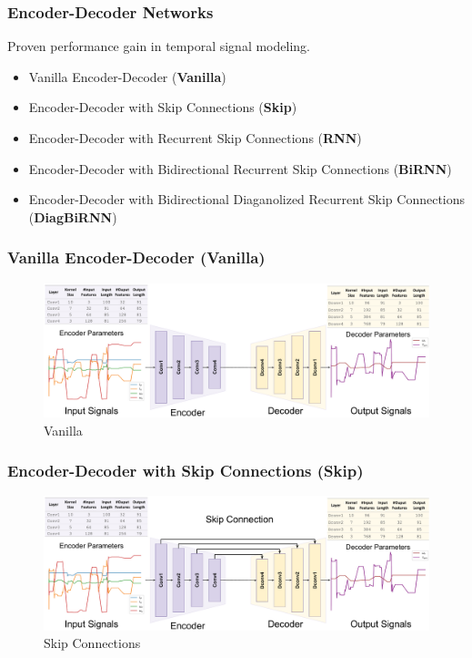 \documentclass{beamer}
\begin{document}
\begin{frame}
\frametitle{Encoder-Decoder Networks}

Proven performance gain in temporal signal modeling.
\begin{itemize}
    \item Vanilla Encoder-Decoder (\textbf{Vanilla})
    \item Encoder-Decoder with Skip Connections (\textbf{Skip})
    \item Encoder-Decoder with Recurrent Skip Connections (\textbf{RNN})
    \item Encoder-Decoder with Bidirectional Recurrent Skip Connections (\textbf{BiRNN})
    \item Encoder-Decoder with Bidirectional Diaganolized Recurrent Skip Connections (\textbf{DiagBiRNN})
\end{itemize}
\end{frame}
\begin{frame}
\frametitle{Vanilla Encoder-Decoder (Vanilla)}

\begin{figure}[ht!]
    \centering
        \includegraphics[scale=0.19]{images/ed_st.pdf}
    \caption{Vanilla}
    \label{fig:random}
    \vspace{-1em}
\end{figure}

\end{frame}


\begin{frame}
\frametitle{Encoder-Decoder with Skip Connections (Skip)}

\begin{figure}[ht!]
    \centering
        \includegraphics[scale=0.19]{images/ed_st_skip.pdf}
    \caption{Skip Connections}
    \label{fig:random}
    \vspace{-1em}
\end{figure}

\end{frame}
\end{document}

